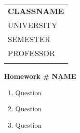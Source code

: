 \documentclass[10pt]{article}
\begin{document}

\thispagestyle{empty}

\begin{tabular}{p{15.5cm}}
  {\large \bf CLASSNAME} \\ UNIVERSITY \\ SEMESTER \\ PROFESSOR \\ \hline \\
\end{tabular}

\vspace{3mm}

\begin{center}
  {\Large \bf Homework \#}
  \vspace{2mm}
         {\bf NAME}
\end{center}

\vspace{4mm}

\begin{enumerate}
\item Question
\item Question
\item Question
\end{enumerate}
\end{document}
